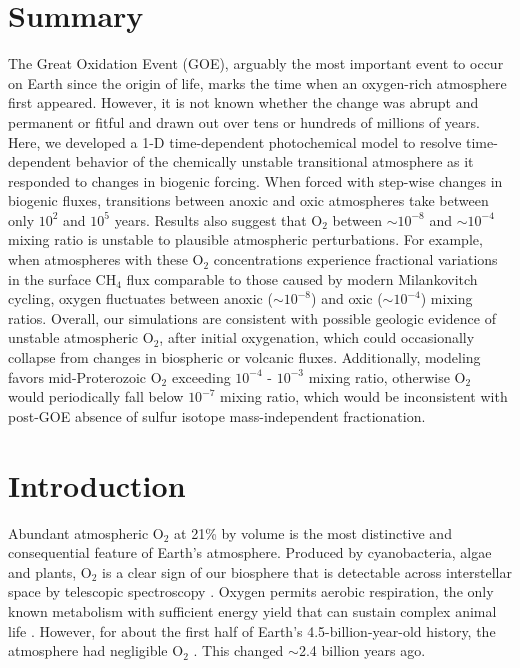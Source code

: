 
\section*{\centering Summary}

The Great Oxidation Event (GOE), arguably the most important event to occur on Earth since the origin of life, marks the time when an oxygen-rich atmosphere first appeared. However, it is not known whether the change was abrupt and permanent or fitful and drawn out over tens or hundreds of millions of years. Here, we developed a 1-D time-dependent photochemical model to resolve time-dependent behavior of the chemically unstable transitional atmosphere as it responded to changes in biogenic forcing. When forced with step-wise changes in biogenic fluxes, transitions between anoxic and oxic atmospheres take between only $10^2$ and $10^5$ years. Results also suggest that O$_2$ between $\sim10^{-8}$ and $\sim10^{-4}$ mixing ratio is unstable to plausible atmospheric perturbations. For example, when atmospheres with these O$_2$ concentrations experience fractional variations in the surface CH$_4$ flux comparable to those caused by modern Milankovitch cycling, oxygen fluctuates between anoxic ($\sim10^{-8}$) and oxic ($\sim10^{-4}$) mixing ratios. Overall, our simulations are consistent with possible geologic evidence of unstable atmospheric O$_2$, after initial oxygenation, which could occasionally collapse from changes in biospheric or volcanic fluxes. Additionally, modeling favors mid-Proterozoic O$_2$ exceeding $10^{-4}$ - $10^{-3}$ mixing ratio, otherwise O$_2$ would periodically fall below $10^{-7}$ mixing ratio, which would be inconsistent with post-GOE absence of sulfur isotope mass-independent fractionation.

\section{Introduction}

Abundant atmospheric O$_2$ at 21\% by volume is the most distinctive and consequential feature of Earth's atmosphere. Produced by cyanobacteria, algae and plants, O$_2$ is a clear sign of our biosphere that is detectable across interstellar space by telescopic spectroscopy \cite{Meadows_2018}. Oxygen permits aerobic respiration, the only known metabolism  with sufficient energy yield that can sustain complex animal life \cite{Catling_2005}. However, for about the first half of Earth's 4.5-billion-year-old history, the atmosphere had negligible O$_2$ \citep[e.g.][]{Catling_2020}. This changed $\sim$2.4 billion years ago.

